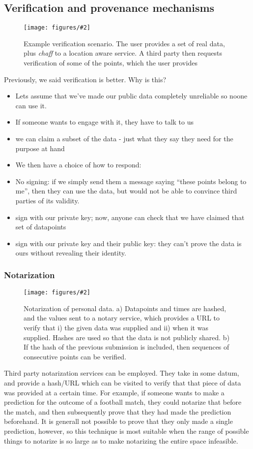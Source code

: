 \documentclass{IOS-Book-Article}     %
\newcommand{\fig}[3][0.9]{
\begin{figure}[tp]
\begin{center}
\texttt{[image: figures/\#2]}
\caption{#3}
\label{fig:#2}
\end{center}
\end{figure}
}
\begin{document}
\subsection{Verification and provenance mechanisms}

\fig{Verification}{Example verification scenario. The user provides a set of
real data, plus \emph{chaff} to a location aware service. A third party then
requests verification of some of the points, which the user provides}

Previously, we said verification is better. Why is this?

\begin{itemize}
  \item Lets assume that we've made our public data completely unreliable so noone can
use it.
\item If someone wants to engage with it, they have to talk to us
\item we can claim a subset of the data - just what they say they need for the
purpose at hand
\item We then have a choice of how to respond:
\item No signing: if we simply send them a message saying ``these
points belong to me'', then they can use the data, but would not be able to
convince third parties of its validity.
\item sign with our private key; now, anyone can check that we have claimed that set of datapoints
\item sign with our private key and their public key: they can't prove the data
is ours without revealing their identity.
\end{itemize}

\subsubsection{Notarization}
\fig{Notarization}{Notarization of personal data. a) Datapoints and times are
hashed, and the values sent to a notary service, which provides a URL to verify
that i) the given data was supplied and ii) when it was supplied. Hashes are
used so that the data is not publicly shared. b) If the hash of the previous
submission is included, then sequences of consecutive points can be verified.}

Third party notarization services can be employed. They take
in some datum, and provide a hash/URL which can be visited to verify that that piece of data was
provided at a certain time. For example, if someone wants to make a prediction
for the outcome of a football match, they could notarize that before the match,
and then subsequently prove that they had made the prediction beforehand. It is
generall not possible to prove that they only made a single prediction, however,
so this technique is most suitable when the range of possible things to notarize
is so large as to make notarizing the entire space infeasible.
\end{document}
